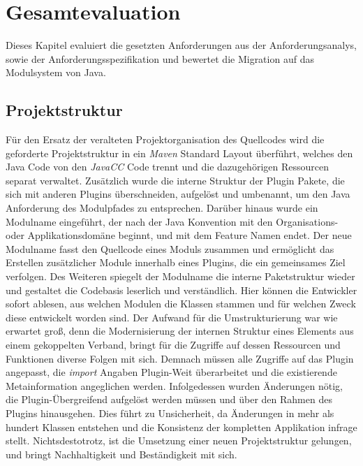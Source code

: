 \chapter{Gesamtevaluation}
Dieses Kapitel evaluiert die gesetzten Anforderungen aus der Anforderungsanalys, sowie der Anforderungsspezifikation und bewertet die Migration auf das Modulsystem von Java.\bigbreak

\section{Projektstruktur}
Für den Ersatz der veralteten Projektorganisation des Quellcodes wird die geforderte Projektstruktur in ein \textit{Maven} Standard Layout überführt, welches den Java Code von den \textit{JavaCC} Code trennt und die dazugehörigen Ressourcen separat verwaltet. Zusätzlich wurde die interne Struktur der Plugin Pakete, die sich mit anderen Plugins überschneiden, aufgelöst und umbenannt, um den Java Anforderung des Modulpfades zu entsprechen. Darüber hinaus wurde ein Modulname eingeführt, der nach der Java Konvention mit den Organisations- oder Applikationsdomäne beginnt, und mit dem Feature Namen endet. Der neue Modulname fasst den Quellcode eines Moduls zusammen und ermöglicht das Erstellen zusätzlicher Module innerhalb eines Plugins, die ein gemeinsames Ziel verfolgen. Des Weiteren spiegelt der Modulname die interne Paketstruktur wieder und gestaltet die Codebasis leserlich und verständlich. Hier können die Entwickler sofort ablesen, aus welchen Modulen die Klassen stammen und für welchen Zweck diese entwickelt worden sind.\newline
Der Aufwand für die Umstrukturierung war wie erwartet groß, denn die Modernisierung der internen Struktur eines Elements aus einem gekoppelten Verband, bringt für die Zugriffe auf dessen Ressourcen und Funktionen diverse Folgen mit sich. Demnach müssen alle Zugriffe auf das Plugin angepasst, die \textit{import} Angaben Plugin-Weit überarbeitet und die existierende Metainformation angeglichen werden. Infolgedessen wurden Änderungen nötig, die Plugin-Übergreifend aufgelöst werden müssen und über den Rahmen des Plugins hinausgehen. Dies führt zu Unsicherheit, da Änderungen in mehr als hundert Klassen entstehen und die Konsistenz der kompletten Applikation infrage stellt. \newline
Nichtsdestotrotz, ist die Umsetzung einer neuen Projektstruktur gelungen, und bringt Nachhaltigkeit und Beständigkeit mit sich.\bigbreak

